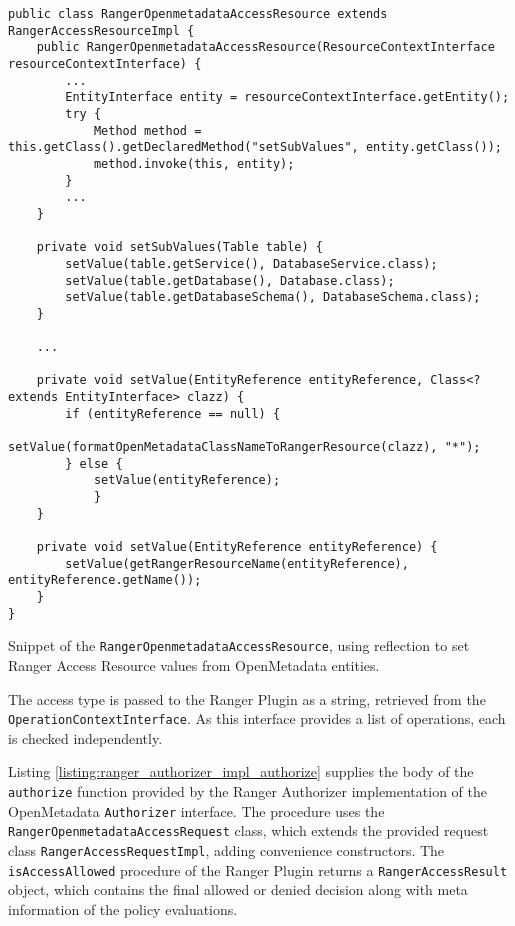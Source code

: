 \begin{listing}

\begin{verbatim}
public class RangerOpenmetadataAccessResource extends RangerAccessResourceImpl {
    public RangerOpenmetadataAccessResource(ResourceContextInterface resourceContextInterface) {
        ...
        EntityInterface entity = resourceContextInterface.getEntity();
        try {
            Method method = this.getClass().getDeclaredMethod("setSubValues", entity.getClass());
            method.invoke(this, entity);
        } 
        ...
    }
    
    private void setSubValues(Table table) {
        setValue(table.getService(), DatabaseService.class);
        setValue(table.getDatabase(), Database.class);
        setValue(table.getDatabaseSchema(), DatabaseSchema.class);
    }
    
    ...

    private void setValue(EntityReference entityReference, Class<? extends EntityInterface> clazz) {
        if (entityReference == null) {
            setValue(formatOpenMetadataClassNameToRangerResource(clazz), "*");
        } else {
            setValue(entityReference);
            }
    }

    private void setValue(EntityReference entityReference) {
        setValue(getRangerResourceName(entityReference), entityReference.getName());
    }
}
\end{verbatim}

\caption{Snippet of the \texttt{RangerOpenmetadataAccessResource}, using reflection to set Ranger Access Resource values from OpenMetadata entities.}

\label{listing:ranger_openmetadta_access_resource}

\end{listing}

The access type is passed to the Ranger Plugin as a string, retrieved from the \texttt{OperationContextInterface}. As this interface provides a list of operations, each is checked independently.

Listing \ref{listing:ranger_authorizer_impl_authorize} supplies the body of the \texttt{authorize} function provided by the Ranger Authorizer implementation of the OpenMetadata \texttt{Authorizer} interface. The procedure uses the \texttt{RangerOpenmetadataAccessRequest} class, which extends the provided request class \texttt{RangerAccessRequestImpl}, adding convenience constructors. The \texttt{isAccessAllowed} procedure of the Ranger Plugin returns a \texttt{RangerAccessResult} object, which contains the final allowed or denied decision along with meta information of the policy evaluations.


